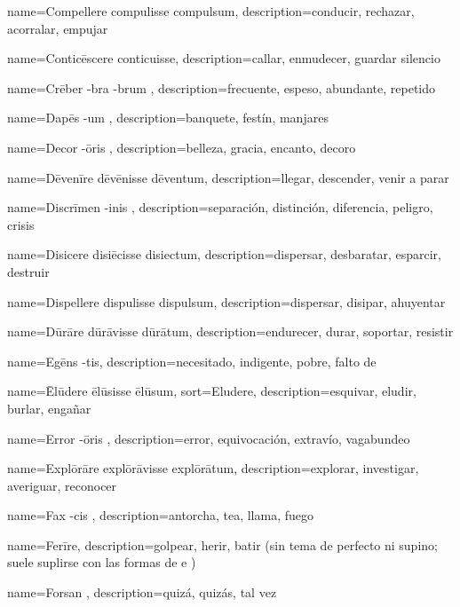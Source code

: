 {name={Compellere compulisse compulsum},
description={conducir, rechazar, acorralar, empujar}}

{name={Conticēscere conticuisse},
description={callar, enmudecer, guardar silencio}}

{name={Crēber -bra -brum },
description={frecuente, espeso, abundante, repetido}}

{name={Dapēs -um },
description={banquete, festín, manjares}}

{name={Decor -ōris },
description={belleza, gracia, encanto, decoro}}

{name={Dēvenīre dēvēnisse dēventum},
description={llegar, descender, venir a parar}}

{name={Discrīmen -inis },
description={separación, distinción, diferencia, peligro, crisis}}

{name={Disicere disiēcisse disiectum},
description={dispersar, desbaratar, esparcir, destruir}}

{name={Dispellere dispulisse dispulsum},
description={dispersar, disipar, ahuyentar}}

{name={Dūrāre dūrāvisse dūrātum},
description={endurecer, durar, soportar, resistir}}

{name={Egēns -tis},
description={necesitado, indigente, pobre, falto de}}

{name={\=Elūdere ēlūsisse ēlūsum},
sort={Eludere},
description={esquivar, eludir, burlar, engañar}}

{name={Error -ōris },
description={error, equivocación, extravío, vagabundeo}}

{name={Explōrāre explōrāvisse explōrātum},
description={explorar, investigar, averiguar, reconocer}}


{name={Fax -cis },
description={antorcha, tea, llama, fuego}}

{name={Ferīre},
description={golpear, herir, batir (sin tema de perfecto ni supino; suele suplirse con las formas de  e )}}

{name={Forsan },
description={quizá, quizás, tal vez}}

